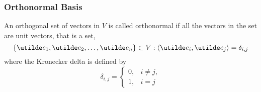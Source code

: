\documentclass{report}
\begin{document}
\subsubsection{Orthonormal Basis}
An orthogonal set of vectors in $V$ is called orthonormal if all the vectors in the set are unit vectors, that is a set,
$$
  \braces{\ut{e}_1, \ut{e}_2, \dots, \ut{e}_n} \subset V: \brangle{\ut{e}_i, \ut{e}_j} = \delta_{i,j}
$$
where the Kronecker delta is defined by
$$
  \delta_{i,j} = \left\lbrace \begin{array}{ll}
    0, & i\neq j, \\
    1, & i = j
  \end{array} \right.
$$
\end{document}
